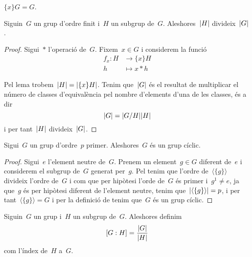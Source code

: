 \documentclass[../../main.tex]{subfiles}
\begin{document}
    \begin{observation}
        \(\{x\}G=G\).
    \end{observation}
    \begin{theorem}
        \label{thm:Teorema de Lagrange}
        Siguin~\(G\) un grup d'ordre finit i~\(H\) un subgrup de~\(G\).
        Aleshores~\(\abs{H}\) divideix~\(\abs{G}\).
        \begin{proof}
            Sigui~\(\ast\) l'operació de~\(G\).
            Fixem~\(x\in G\) i considerem la funció
            \begin{align*}
            f_{x}\colon H&\longrightarrow\{x\}H\\
            h&\longmapsto x\ast h
            \end{align*}

            Pel lema  trobem~\(\abs{H}=\abs{\{x\}H}\).
            Tenim que~\(\abs{G}\) és el resultat de multiplicar el número de classes d'equivalència pel nombre d'elements d'una de les classes, és a dir %
            \[
                \abs{G}=\abs{G/H}\abs{H}
            \]
            i per tant~\(\abs{H}\) divideix~\(\abs{G}\).
        \end{proof}
    \end{theorem}
    \begin{corollary} %
        Sigui~\(G\) un grup d'ordre~\(p\) primer.
        Aleshores~\(G\) és un grup cíclic.
        \begin{proof}
            Sigui~\(e\) l'element neutre de~\(G\).
            Prenem un element~\(g\in G\) diferent de~\(e\) i considerem el subgrup de~\(G\) generat per~\(g\).
            Pel  tenim que l'ordre de~\(\langle\{g\}\rangle\) divideix l'ordre de~\(G\) i com que per hipòtesi l'orde de~\(G\) és primer i~\(g^{1}\neq e\), ja que~\(g\) és per hipòtesi diferent de l'element neutre, tenim que~\(\abs{\langle\{g\}\rangle}=p\), i per tant~\(\langle\{g\}\rangle=G\) i per la definició de  tenim que~\(G\) és un grup cíclic.
        \end{proof}
    \end{corollary}
    \begin{definition}
        \label{def:l'índex d'un subgrup en un grup}
        Siguin~\(G\) un grup i~\(H\) un subgrup de~\(G\).
        Aleshores definim
        \[
            [G:H]=\frac{\abs{G}}{\abs{H}}
        \]
        com l'índex de~\(H\) a~\(G\).
    \end{definition}
\end{document}
